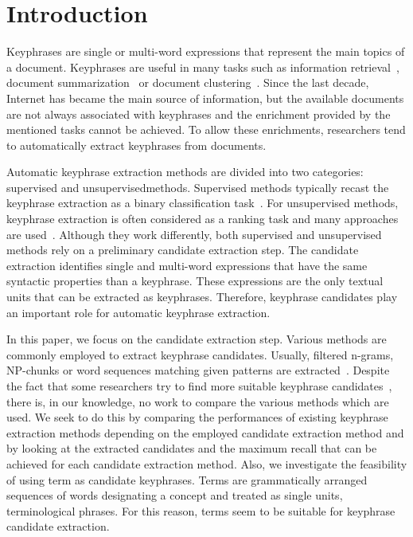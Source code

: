 \section{Introduction}
\label{sec:section}
  Keyphrases are single or multi-word expressions that represent the main topics
  of a document. Keyphrases are useful in many tasks such as information
  retrieval~\cite{medelyan2008smalltrainingset}, document
  summarization~\cite{litvak2008graphbased} or document
  clustering~\cite{han2007webdocumentclustering}. Since the last decade,
  Internet has became the main source of information, but the available
  documents are not always associated with keyphrases and the enrichment
  provided by the mentioned tasks cannot be achieved. To allow these
  enrichments, researchers tend to automatically extract keyphrases from
  documents.

  Automatic keyphrase extraction methods are divided into two categories:
  supervised and unsupervisedmethods. Supervised methods typically recast the
  keyphrase extraction as a binary classification task~\cite{witten1999kea}.
  For unsupervised methods, keyphrase extraction is often considered as a
  ranking task and many approaches are
  used~\cite{barker2000nounphrasehead,mihalcea2004textrank}. Although they work
  differently, both supervised and unsupervised methods rely on a preliminary
  candidate extraction step. The candidate extraction identifies single and
  multi-word expressions that have the same syntactic properties than a
  keyphrase. These expressions are the only textual units that can be extracted
  as keyphrases. Therefore, keyphrase candidates play an important role for
  automatic keyphrase extraction.
  
  In this paper, we focus on the candidate extraction step. Various methods are
  commonly employed to extract keyphrase candidates. Usually, filtered n-grams,
  NP-chunks or word sequences matching given patterns are
  extracted~\cite{hulth2003keywordextraction}. Despite the fact that some
  researchers try to find more suitable keyphrase
  candidates~\cite{hulth2003keywordextraction,kim2009reexaminingautomatickeyphraseextraction},
  there is, in our knowledge, no work to compare the various methods which are
  used. We seek to do this by comparing the performances of existing keyphrase
  extraction methods depending on the employed candidate extraction method and
  by looking at the extracted candidates and the maximum recall that can be
  achieved for each candidate extraction method. Also, we investigate the
  feasibility of using term as candidate keyphrases. Terms are grammatically
  arranged sequences of words designating a concept and treated as single units,
  terminological phrases. For this reason, terms seem to be suitable for
  keyphrase candidate extraction.

